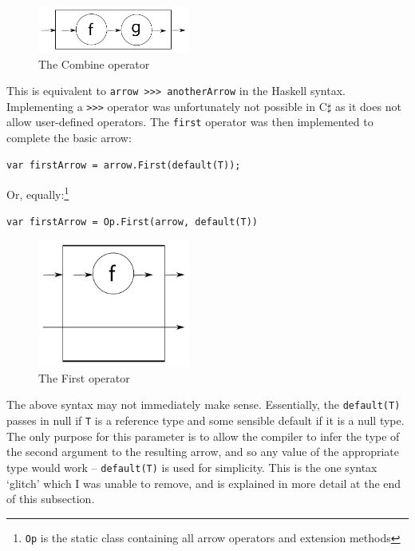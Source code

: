 \documentclass[12pt,twoside,notitlepage]{report}
\begin{document}
\begin{figure}[!ht]
  \centering
  \includegraphics[width=50mm]{fig/CompositionOperator.pdf}
  \caption{The Combine operator}
  \label{fig:combine_operator}
\end{figure}

This is equivalent to \texttt{arrow >>> anotherArrow} in the Haskell syntax. Implementing a \texttt{>>>} operator was unfortunately not possible in C$\sharp$ as it does not allow user-defined operators. The \texttt{first} operator was then implemented to complete the basic arrow:

\begin{lstlisting}[language={[Sharp]C}]
var firstArrow = arrow.First(default(T));
\end{lstlisting}

Or, equally:\footnote{\texttt{Op} is the static class containing all arrow operators and extension methods}

\begin{lstlisting}[language={[Sharp]C}]
var firstArrow = Op.First(arrow, default(T))
\end{lstlisting}

\begin{figure}[!ht]
  \centering
  \includegraphics[width=50mm]{fig/FirstOperator.pdf}
  \caption{The First operator}
  \label{fig:first_operator}
\end{figure}

The above syntax may not immediately make sense. Essentially, the \texttt{default(T)} passes in null if \texttt{T} is a reference type and some sensible default if it is a null type. The only purpose for this parameter is to allow the compiler to infer the type of the second argument to the resulting arrow, and so any value of the appropriate type would work -- \texttt{default(T)} is used for simplicity. This is the one syntax `glitch' which I was unable to remove, and is explained in more detail at the end of this subsection.
\end{document}
